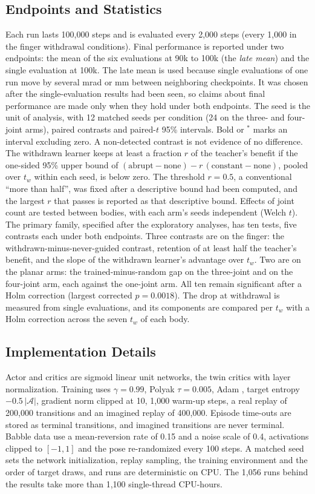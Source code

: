\documentclass[journal]{IEEEtran}
\begin{document}
\subsection{Endpoints and Statistics}
\label{sec:stats}
Each run lasts 100{,}000 steps and is evaluated every 2{,}000 steps (every
1{,}000 in the finger withdrawal conditions). Final performance is reported under two
endpoints: the mean of the six evaluations at 90k to 100k (the \emph{late mean})
and the single evaluation at 100k. The late mean is used because single evaluations of one run move by several
mrad or mm between neighboring checkpoints. It was chosen after the
single-evaluation results had been seen, so claims about final performance are
made only when they hold under both endpoints. The seed is the unit of analysis, with 12 matched seeds
per condition (24 on the three- and four-joint arms), paired contrasts
and paired-$t$ 95\% intervals. Bold or $^*$ marks an interval excluding zero. A
non-detected contrast is not evidence of no difference. The withdrawn learner
keeps at least a fraction $r$ of the teacher's benefit if the one-sided 95\%
upper bound of $(\text{abrupt}-\text{none}) - r\,(\text{constant}-\text{none})$,
pooled over $t_w$ within each seed, is below zero. The threshold $r=0.5$, a
conventional ``more than half'', was fixed after a descriptive bound had been
computed, and the largest $r$ that passes is reported
as that descriptive bound.
Effects of joint count are tested between bodies, with each arm's seeds
independent (Welch $t$). The primary family, specified after the exploratory
analyses, has ten tests, five contrasts each under both endpoints. Three contrasts are on the finger: the
withdrawn-minus-never-guided contrast, retention of at least half the teacher's
benefit, and the slope of the withdrawn learner's advantage over $t_w$. Two are
on the planar arms: the trained-minus-random gap on the three-joint and on the
four-joint arm, each against the one-joint arm. All ten remain significant after a
Holm correction \cite{holm1979} (largest corrected $p=0.0018$). The drop at withdrawal is
measured from single evaluations, and its components are compared per $t_w$ with a
Holm correction across the seven $t_w$ of each body.

\subsection{Implementation Details}
Actor and critics are sigmoid linear unit networks, the twin critics with layer
normalization. Training uses $\gamma=0.99$, Polyak $\tau=0.005$, Adam \cite{kingma2015}, target entropy
$-0.5\,|\mathcal{A}|$, gradient norm clipped at 10, 1{,}000 warm-up steps, a real replay of 200{,}000 transitions
and an imagined replay of 400{,}000. Episode time-outs are stored
as terminal transitions, and imagined transitions are never terminal. Babble data
use a mean-reversion rate of 0.15 and a noise scale of 0.4, activations clipped to $[-1,1]$ and the pose
re-randomized every 100 steps. A matched seed sets the network initialization,
replay sampling, the training environment and the order of target draws, and runs
are deterministic on CPU. The 1{,}056 runs behind the results take more than
1{,}100 single-thread CPU-hours.
\end{document}
